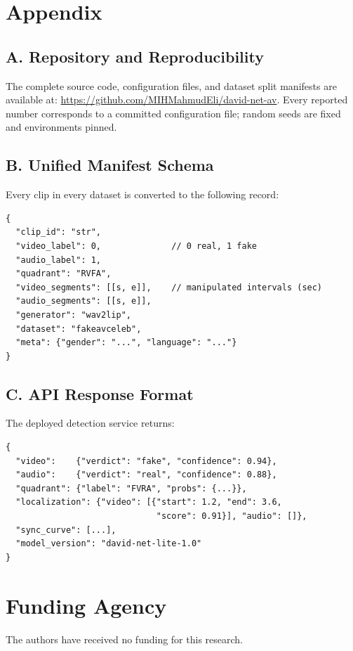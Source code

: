 \chapter*{Appendix}

\section*{A. Repository and Reproducibility}
The complete source code, configuration files, and dataset split manifests are
available at: \url{https://github.com/MIHMahmudEli/david-net-av}. Every
reported number corresponds to a committed configuration file; random seeds are
fixed and environments pinned.

\section*{B. Unified Manifest Schema}
Every clip in every dataset is converted to the following record:
\begin{verbatim}
{
  "clip_id": "str",
  "video_label": 0,              // 0 real, 1 fake
  "audio_label": 1,
  "quadrant": "RVFA",
  "video_segments": [[s, e]],    // manipulated intervals (sec)
  "audio_segments": [[s, e]],
  "generator": "wav2lip",
  "dataset": "fakeavceleb",
  "meta": {"gender": "...", "language": "..."}
}
\end{verbatim}

\section*{C. API Response Format}
The deployed detection service returns:
\begin{verbatim}
{
  "video":    {"verdict": "fake", "confidence": 0.94},
  "audio":    {"verdict": "real", "confidence": 0.88},
  "quadrant": {"label": "FVRA", "probs": {...}},
  "localization": {"video": [{"start": 1.2, "end": 3.6,
                              "score": 0.91}], "audio": []},
  "sync_curve": [...],
  "model_version": "david-net-lite-1.0"
}
\end{verbatim}

\chapter*{Funding Agency}

The authors have received no funding for this research.
